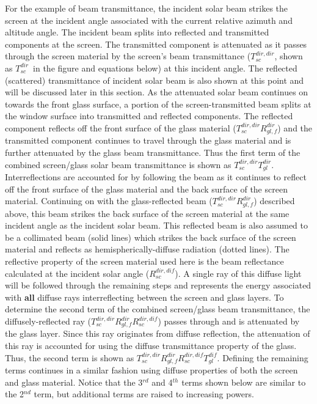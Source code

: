 For the example of beam transmittance, the incident solar beam strikes the screen at the incident angle associated with the current relative azimuth and altitude angle. The incident beam splits into reflected and transmitted components at the screen. The transmitted component is attenuated as it passes through the screen material by the screen's beam transmittance (\(T_{sc}^{dir,dir}\), shown as \(T_{sc}^{dir}\)~in the figure and equations below) at this incident angle. The reflected (scattered) transmittance of incident solar beam is also shown at this point and will be discussed later in this section. As the attenuated solar beam continues on towards the front glass surface, a portion of the screen-transmitted beam splits at the window surface into transmitted and reflected components. The reflected component reflects off the front surface of the glass material (\(T_{sc}^{dir,dir}R_{gl,f}^{dir}\)) and the transmitted component continues to travel through the glass material and is further attenuated by the glass beam transmittance. Thus the first term of the combined screen/glass solar beam transmittance is shown as \(T_{sc}^{dir,dir}T_{gl}^{dir}\). Interreflections are accounted for by following the beam as it continues to reflect off the front surface of the glass material and the back surface of the screen material. Continuing on with the glass-reflected beam (\(T_{sc}^{dir,dir}R_{gl,f}^{dir}\)) described above, this beam strikes the back surface of the screen material at the same incident angle as the incident solar beam. This reflected beam is also assumed to be a collimated beam (solid lines) which strikes the back surface of the screen material and reflects as hemispherically-diffuse radiation (dotted lines). The reflective property of the screen material used here is the beam reflectance calculated at the incident solar angle (\(R_{sc}^{dir,dif}\)). A single ray of this diffuse light will be followed through the remaining steps and represents the energy associated with \textbf{all} diffuse rays interreflecting between the screen and glass layers. To determine the second term of the combined screen/glass beam transmittance, the diffusely-reflected ray (\(T_{sc}^{dir,dir}R_{gl,f}^{dir}R_{sc}^{dir,dif}\)) passes through and is attenuated by the glass layer. Since this ray originates from diffuse reflection, the attenuation of this ray is accounted for using the diffuse transmittance property of the glass. Thus, the second term is shown as \(T_{sc}^{dir,dir}R_{gl,f}^{dir}R_{sc}^{dir,dif}T_{gl}^{dif}\). Defining the remaining terms continues in a similar fashion using diffuse properties of both the screen and glass material. Notice that the 3\(^{rd}\) and 4\(^{th}\) terms shown below are similar to the 2\(^{nd}\) term, but additional terms are raised to increasing powers.

